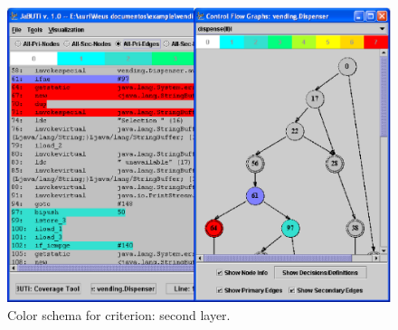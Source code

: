 \begin{figure}[!ht]
\begin{center}
\includegraphics[height=0.40\textheight]{fig/decision-layer2.eps}
\caption{\label{fig:decision-color2} Color schema for
 criterion: second layer.}
\end{center}
\end{figure}
